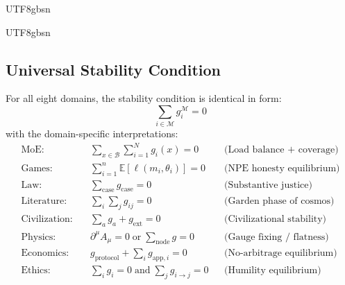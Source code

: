 \documentclass[11pt,a4paper]{article}
\newcommand{\Manifold}{\mathcal{M}}
\newcommand{\EE}{\mathbb{E}}
\begin{document}
\begin{CJK}{UTF8}{gbsn}
{\begin{CJK}{UTF8}{gbsn}
\subsection{Universal Stability Condition}
For all eight domains, the stability condition is identical in form:
\begin{equation}
    \boxed{\sum_{i \in \Manifold} g_i^{\Manifold} = 0}
\end{equation}
with the domain-specific interpretations:
\begin{align}
    \text{MoE:} \quad & \sum_{x \in \mathcal{B}} \sum_{i=1}^N g_i(x) = 0
        && \text{(Load balance + coverage)} \\
    \text{Games:} \quad & \sum_{i=1}^n \EE[\ell(m_i, \theta_i)] = 0
        && \text{(NPE honesty equilibrium)} \\
    \text{Law:} \quad & \sum_{\text{case}} g_{\text{case}} = 0
        && \text{(Substantive justice)} \\
    \text{Literature:} \quad & \sum_i \sum_j g_{ij} = 0
        && \text{(Garden phase of cosmos)} \\
    \text{Civilization:} \quad & \sum_a g_a + g_{\text{ext}} = 0
        && \text{(Civilizational stability)} \\
    \text{Physics:} \quad & \partial^\mu A_\mu = 0 \;\text{or}\; \sum_{\text{node}} g = 0
        && \text{(Gauge fixing / flatness)} \\
    \text{Economics:} \quad & g_{\text{protocol}} + \sum_i g_{\text{app}, i} = 0
        && \text{(No-arbitrage equilibrium)} \\
    \text{Ethics:} \quad & \sum_i g_i = 0 \;\text{and}\; \sum_j g_{i \to j} = 0
        && \text{(Humility equilibrium)}
\end{align}

\end{CJK}}
\end{CJK}
\end{document}
